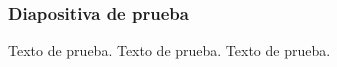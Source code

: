 \documentclass{beamer}
\title{\Titulo}
\author{\Autor}
\institute{Escuela Superior de Cómputo}
\date{\Fecha}
\begin{document}
  \frame{\titlepage}

  \begin{frame}
    \frametitle{Diapositiva de prueba}
    Texto de prueba.
    Texto de prueba.
    Texto de prueba.
  \end{frame}
\end{document}
